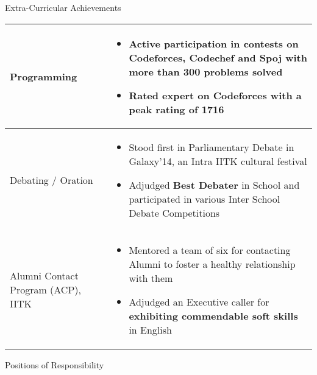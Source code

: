 \documentclass{article}
\begin{document}
{\Large Extra-Curricular Achievements}
\newline
\newline
\begin{tabular}{| P{3cm} |  P{15.4cm}|}
\hline
\vspace{0.3cm}Programming & \vspace{-0.4cm}\begin{itemize}[leftmargin=0.3cm]
\setlength\itemsep{0.2pt}
\item Active participation in contests on Codeforces, Codechef and Spoj with more than \textbf{300} problems solved
\item Rated expert on Codeforces with a peak rating of \textbf{1716}
\end{itemize}\\
\hline
\vspace{0.3cm}Debating / Oration & \vspace{-0.4cm}\begin{itemize}[leftmargin=0.3cm]
\setlength\itemsep{0.2pt}
\item Stood first in Parliamentary Debate in Galaxy'14, an Intra IITK cultural festival 
\item Adjudged \textbf{Best Debater} in School and participated in various Inter School Debate Competitions
\end{itemize}\\
\hline
\vspace{0cm}Alumni Contact Program (ACP), IITK & \vspace{-0.4cm}\begin{itemize}[leftmargin=0.3cm]
\setlength\itemsep{0.2pt}
\item Mentored a team of six for contacting Alumni to foster a healthy relationship with them
\item Adjudged an Executive caller for \textbf{exhibiting commendable soft skills} in English\end{itemize}\\
\hline
\end{tabular}\vspace{0.2cm}
{\Large Positions of Responsibility}
\newline
\newline
\end{document}
